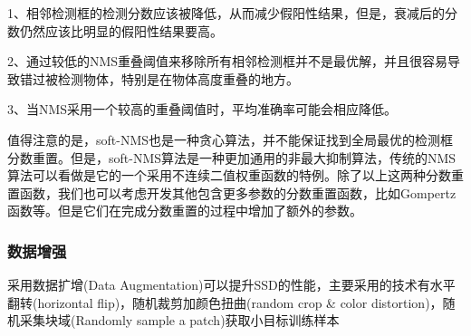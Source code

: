 1、相邻检测框的检测分数应该被降低，从而减少假阳性结果，但是，衰减后的分数仍然应该比明显的假阳性结果要高。

2、通过较低的NMS重叠阈值来移除所有相邻检测框并不是最优解，并且很容易导致错过被检测物体，特别是在物体高度重叠的地方。

3、当NMS采用一个较高的重叠阈值时，平均准确率可能会相应降低。

值得注意的是，soft-NMS也是一种贪心算法，并不能保证找到全局最优的检测框分数重置。但是，soft-NMS算法是一种更加通用的非最大抑制算法，传统的NMS算法可以看做是它的一个采用不连续二值权重函数的特例。除了以上这两种分数重置函数，我们也可以考虑开发其他包含更多参数的分数重置函数，比如Gompertz函数等。但是它们在完成分数重置的过程中增加了额外的参数。
\subsubsection{数据增强}
采用数据扩增(Data Augmentation)可以提升SSD的性能，主要采用的技术有水平翻转(horizontal flip)，随机裁剪加颜色扭曲(random crop \& color distortion)，随机采集块域(Randomly sample a patch)获取小目标训练样本